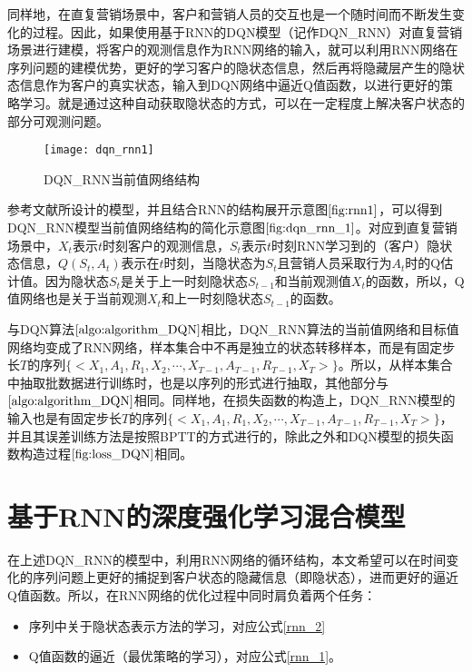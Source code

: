  同样地，在直复营销场景中，客户和营销人员的交互也是一个随时间而不断发生变化的过程。因此，如果使用基于RNN的DQN模型（记作DQN_RNN）对直复营销场景进行建模，将客户的观测信息作为RNN网络的输入，就可以利用RNN网络在序列问题的建模优势，更好的学习客户的隐状态信息，然后再将隐藏层产生的隐状态信息作为客户的真实状态，输入到DQN网络中逼近Q值函数，以进行更好的策略学习。就是通过这种自动获取隐状态的方式，可以在一定程度上解决客户状态的部分可观测问题。

  \begin{figure}[htbp]
 \centering
 \texttt{[image: dqn\_rnn1]}
 \caption{DQN_RNN当前值网络结构}
 \label{fig:dqn_rnn_1}
 \end{figure}

 参考文献\citep{hausknecht2015deep,narasimhan2015language}所设计的模型，并且结合RNN的结构展开示意图$\ref{fig:rnn1}$，可以得到DQN_RNN模型当前值网络结构的简化示意图$\ref{fig:dqn_rnn_1}$。对应到直复营销场景中，$X_{t}$表示$t$时刻客户的观测信息，$S_{t}$表示$t$时刻RNN学习到的（客户）隐状态信息，$Q(S_{t}, A_{t})$表示在$t$时刻，当隐状态为$S_{t}$且营销人员采取行为$A_{t}$时的Q估计值。因为隐状态$S_{t}$是关于上一时刻隐状态$S_{t-1}$和当前观测值$X_{t}$的函数，所以，Q值网络也是关于当前观测$X_{t}$和上一时刻隐状态$S_{t-1}$的函数。

 与DQN算法$\ref{algo:algorithm_DQN}$相比，DQN\_RNN算法的当前值网络和目标值网络均变成了RNN网络，样本集合中不再是独立的状态转移样本，而是有固定步长$T$的序列$\{<X_{1}, A_{1}, R_{1}, X_{2}, \cdots, X_{T-1}, A_{T-1}, R_{T-1},X_{T}>\}$。所以，从样本集合中抽取批数据进行训练时，也是以序列的形式进行抽取，其他部分与$\ref{algo:algorithm_DQN}$相同。同样地，在损失函数的构造上，DQN\_RNN模型的输入也是有固定步长$T$的序列$\{<X_{1}, A_{1}, R_{1}, X_{2}, \cdots, X_{T-1}, A_{T-1}, R_{T-1},X_{T}>\}$，并且其误差训练方法是按照BPTT的方式进行的\citep{bersini1997simplification}，除此之外和DQN模型的损失函数构造过程$\ref{fig:loss_DQN}$相同。


\section{基于RNN的深度强化学习混合模型}
在上述DQN\_RNN的模型中，利用RNN网络的循环结构，本文希望可以在时间变化的序列问题上更好的捕捉到客户状态的隐藏信息（即隐状态），进而更好的逼近Q值函数。所以，在RNN网络的优化过程中同时肩负着两个任务：

\begin{itemize}
\item 序列中关于隐状态表示方法的学习，对应公式\eqref{rnn_2}
\item Q值函数的逼近（最优策略的学习），对应公式\eqref{rnn_1}。
\end{itemize}

